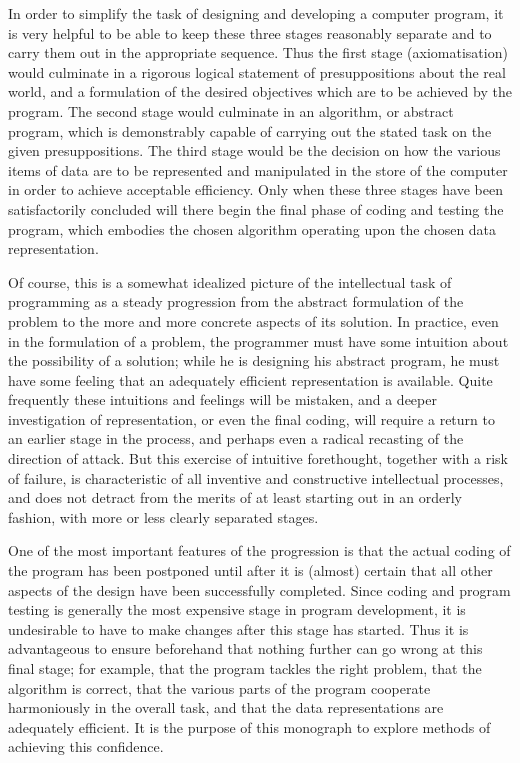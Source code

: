 \documentclass[twoside,11pt]{book}
\begin{document}
In order to simplify the task of designing and developing a computer program, it is very helpful to be able to keep these three stages reasonably separate and to carry them out in the appropriate sequence. Thus the first stage (axiomatisation) would culminate in a rigorous logical statement of presuppositions about the real world, and a formulation of the desired objectives which are to be achieved by the program. The second stage would culminate in an algorithm, or abstract program, which is demonstrably capable of carrying out the stated task on the given presuppositions. The third stage would be the decision on how the various items of data are to be represented and manipulated in the store of the computer in order to achieve acceptable efficiency. Only when these three stages have been satisfactorily concluded will there begin the final phase of coding and testing the program, which embodies the chosen algorithm operating upon the chosen data representation.

Of course, this is a somewhat idealized picture of the intellectual task of programming as a steady progression from the abstract formulation of the problem to the more and more concrete aspects of its solution. In practice, even in the formulation of a problem, the programmer must have some intuition about the possibility of a solution; while he is designing his abstract program, he must have some feeling that an adequately efficient representation is available. Quite frequently these intuitions and feelings will be mistaken,
and a deeper investigation of representation, or even the final coding, will require a return to an earlier stage in the process, and perhaps even a radical recasting of the direction of attack. But this exercise of intuitive forethought, together with a risk of failure, is characteristic of all inventive and constructive intellectual processes, and does not detract from the merits of at least starting out in an orderly fashion, with more or less clearly separated stages.

One of the most important features of the progression is that the actual coding of the program has been postponed until after it is (almost) certain that all other aspects of the design have been successfully completed. Since coding and program testing is generally the most expensive stage in program development, it is undesirable to have to make changes after this stage has started. Thus it is advantageous to ensure beforehand that nothing further can go wrong at this final stage; for example, that the program tackles the right problem, that the algorithm is correct, that the various parts of the program cooperate harmoniously in the overall task, and that the data representations are adequately efficient. It is the purpose of this monograph to explore methods of achieving this confidence.
\end{document}

